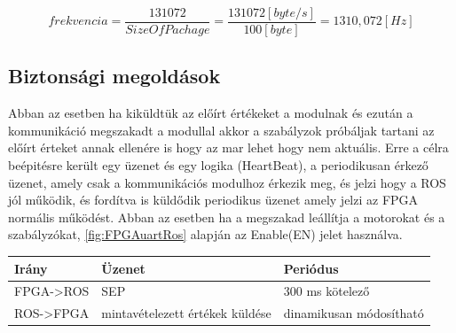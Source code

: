 \begin{equation}
    frekvencia = \frac{131072}{SizeOfPachage}=\frac{131072[byte/s]}{100[byte]}=1310,072 [Hz]
\end{equation}

\subsection{Biztonsági megoldások}

Abban az esetben ha kiküldtük az előírt értékeket a modulnak és ezután a kommunikáció megszakadt a modullal akkor a szabályzok próbáljak tartani az előírt érteket annak ellenére is hogy az mar lehet hogy nem aktuális. Erre a célra beépitésre került egy üzenet és egy logika (HeartBeat), a periodikusan érkező üzenet, amely csak a kommunikációs modulhoz érkezik meg, és jelzi hogy a ROS jól működik, és fordítva is küldődik periodikus üzenet amely jelzi az FPGA normális működést. Abban az esetben ha a  megszakad leállítja a motorokat és a szabályzókat,  \ref{fig:FPGAuartRos} alapján az Enable(EN) jelet használva.

\begin{table}[H]
\center
\begin{tabular}{lll}
\hline Irány   & Üzenet & Periódus    \\ \hline
FPGA->ROS &  SEP        & 300 ms kötelező         \\
ROS->FPGA &  mintavételezett értékek küldése & dinamikusan módosítható                   
\end{tabular}
\end{table}
